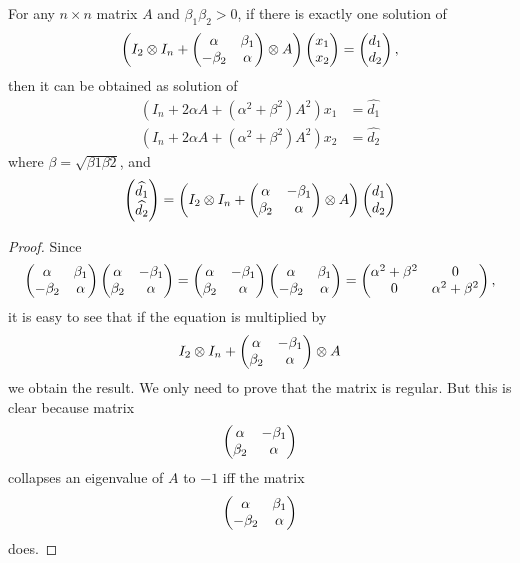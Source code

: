 \documentclass[11pt,a4paper]{article}
\begin{document}
\begin{lemma}
\label{sylv:first-lemma}
For any $n\times n$ matrix $A$ and $\beta_1\beta_2>0$, if there is
exactly one solution of
$$\left(I_2\otimes I_n +
\begin{pmatrix}\alpha&\beta_1\cr-\beta_2&\alpha\end{pmatrix}
\otimes A\right)\begin{pmatrix} x_1\cr x_2\end{pmatrix} =
\begin{pmatrix} d_1\cr d_2\end{pmatrix},$$
then it can be obtained as solution of
\begin{align*}
\left(I_n + 2\alpha A+(\alpha^2+\beta^2)A^2\right)x_1 & =
\widehat{d_1}\\
\left(I_n + 2\alpha A+(\alpha^2+\beta^2)A^2\right)x_2 & =
\widehat{d_2}
\end{align*}
where $\beta=\sqrt{\beta1\beta2}$, and
$$
\begin{pmatrix} \widehat{d_1}\cr\widehat{d_2}\end{pmatrix} =
\left(I_2\otimes I_n +
\begin{pmatrix}\alpha&-\beta_1\cr\beta_2&\alpha\end{pmatrix}
\otimes A\right)\begin{pmatrix} d_1\cr d_2\end{pmatrix}$$
\end{lemma}

\begin{proof} Since
$$
\begin{pmatrix} \alpha&\beta_1\cr-\beta_2&\alpha\end{pmatrix}
\begin{pmatrix} \alpha&-\beta_1\cr\beta_2&\alpha\end{pmatrix}
=
\begin{pmatrix} \alpha&-\beta_1\cr\beta_2&\alpha\end{pmatrix}
\begin{pmatrix} \alpha&\beta_1\cr-\beta_2&\alpha\end{pmatrix}
=
\begin{pmatrix} \alpha^2+\beta^2&0\cr 0&\alpha^2+\beta^2\end{pmatrix},
$$
it is easy to see that if the equation is multiplied by
$$I_2\otimes I_n +
\begin{pmatrix}\alpha&-\beta_1\cr\beta_2&\alpha\end{pmatrix}
\otimes A$$
we obtain the result. We only need to prove that the matrix is
regular. But this is clear because matrix
$$\begin{pmatrix} \alpha&-\beta_1\cr\beta_2&\alpha\end{pmatrix}$$
collapses an eigenvalue of $A$ to $-1$ iff the matrix
$$\begin{pmatrix} \alpha&\beta_1\cr-\beta_2&\alpha\end{pmatrix}$$
does.
\end{proof}
\end{document}
